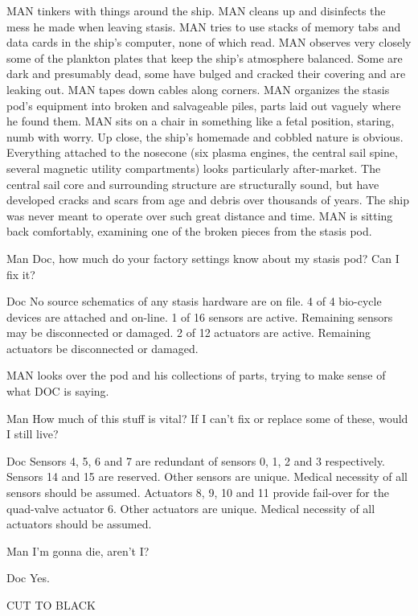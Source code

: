 \documentclass{screenplay}
\begin{document}
\intercut
{}
MAN tinkers with things around the ship.  MAN cleans up and disinfects the mess he made when leaving stasis.  MAN tries to use stacks of memory tabs and data cards in the ship's computer, none of which read.  MAN observes very closely some of the plankton plates that keep the ship's atmosphere balanced.  Some are dark and presumably dead, some have bulged and cracked their covering and are leaking out.  MAN tapes down cables along corners.  MAN organizes the stasis pod's equipment into broken and salvageable piles, parts laid out vaguely where he found them.  MAN sits on a chair in something like a fetal position, staring, numb with worry.
Up close, the ship's homemade and cobbled nature is obvious.  Everything attached to the nosecone (six plasma engines, the central sail spine, several magnetic utility compartments) looks particularly after-market.  The central sail core and surrounding structure are structurally sound, but have developed cracks and scars from age and debris over thousands of years.  The ship was never meant to operate over such great distance and time.
MAN is sitting back comfortably, examining one of the broken pieces from the stasis pod.
\begin{dialogue}{Man}
Doc, how much do your factory settings know about my stasis pod?  Can I fix it?
\end{dialogue}
\begin{dialogue}{Doc}
No source schematics of any stasis hardware are on file.  4 of 4 bio-cycle devices are attached and on-line.  1 of 16 sensors are active.  Remaining sensors may be disconnected or damaged.  2 of 12 actuators are active.  Remaining actuators be disconnected or damaged.
\end{dialogue}
MAN looks over the pod and his collections of parts, trying to make sense of what DOC is saying.
\begin{dialogue}{Man}
How much of this stuff is vital?  If I can't fix or replace some of these, would I still live?
\end{dialogue}
\begin{dialogue}{Doc}
Sensors 4, 5, 6 and 7 are redundant of sensors 0, 1, 2 and 3 respectively.  Sensors 14 and 15 are reserved.  Other sensors are unique.  Medical necessity of all sensors should be assumed.  Actuators 8, 9, 10 and 11 provide fail-over for the quad-valve actuator 6.  Other actuators are unique.  Medical necessity of all actuators should be assumed.
\end{dialogue}
\begin{dialogue}{Man}
I'm gonna die, aren't I?
\end{dialogue}
\begin{dialogue}{Doc}
Yes.
\end{dialogue}
CUT TO BLACK
\end{document}
